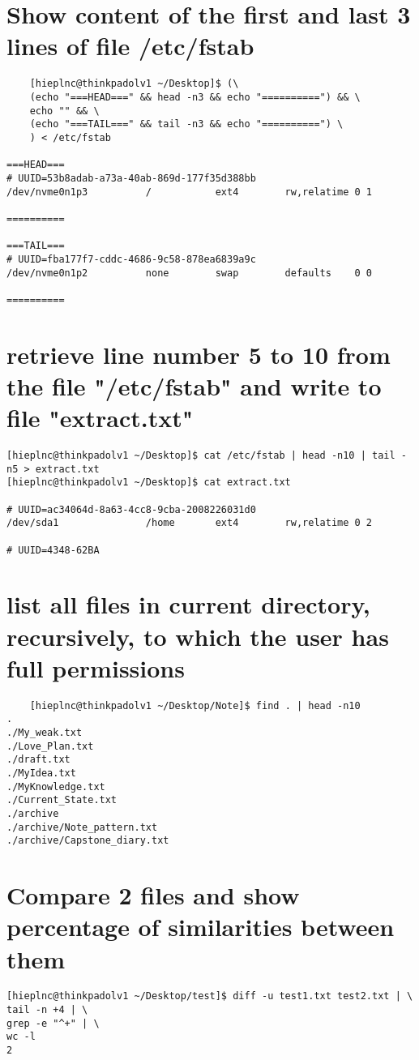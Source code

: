 \documentclass{article}
\begin{document}
	\section{Show content of the first and last 3 lines of file /etc/fstab}
	\begin{verbatim}
	[hieplnc@thinkpadolv1 ~/Desktop]$ (\
	(echo "===HEAD===" && head -n3 && echo "==========") && \
	echo "" && \
	(echo "===TAIL===" && tail -n3 && echo "==========") \
	) < /etc/fstab

===HEAD===
# UUID=53b8adab-a73a-40ab-869d-177f35d388bb
/dev/nvme0n1p3      	/         	ext4      	rw,relatime	0 1

==========

===TAIL===
# UUID=fba177f7-cddc-4686-9c58-878ea6839a9c
/dev/nvme0n1p2      	none      	swap      	defaults  	0 0

==========
	\end{verbatim}

	\section{retrieve line number 5 to 10 from the file "/etc/fstab" and write to file "extract.txt"}
	\begin{verbatim}
[hieplnc@thinkpadolv1 ~/Desktop]$ cat /etc/fstab | head -n10 | tail -n5 > extract.txt
[hieplnc@thinkpadolv1 ~/Desktop]$ cat extract.txt

# UUID=ac34064d-8a63-4cc8-9cba-2008226031d0
/dev/sda1           	/home     	ext4      	rw,relatime	0 2

# UUID=4348-62BA
	\end{verbatim}

	\section{list all files in current directory, recursively, to which the user has full permissions}
	\begin{verbatim}
	[hieplnc@thinkpadolv1 ~/Desktop/Note]$ find . | head -n10
.
./My_weak.txt
./Love_Plan.txt
./draft.txt
./MyIdea.txt
./MyKnowledge.txt
./Current_State.txt
./archive
./archive/Note_pattern.txt
./archive/Capstone_diary.txt
	\end{verbatim}

	\section{Compare 2 files and show percentage of similarities between them}
	\begin{verbatim}
[hieplnc@thinkpadolv1 ~/Desktop/test]$ diff -u test1.txt test2.txt | \
tail -n +4 | \
grep -e "^+" | \
wc -l
2
	\end{verbatim}
\end{document}

